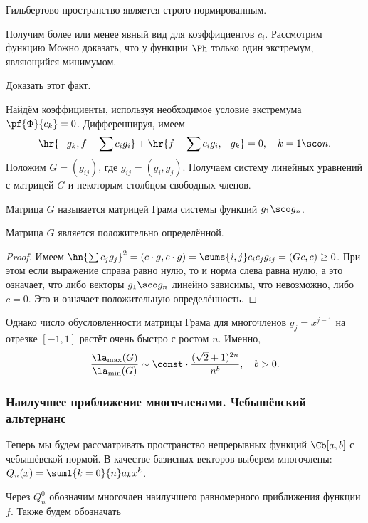 \documentclass[a4paper]{article}
\begin{document}
\begin{problem}
Гильбертово пространство является строго нормированным.
\end{problem}

Получим более или менее явный вид для коэффициентов $c_i$.  Рассмотрим
функцию   Можно доказать, что у функции $\Ph$ только один
экстремум, являющийся минимумом.
\begin{problem}
Доказать этот факт.
\end{problem}
Найдём коэффициенты, используя необходимое условие экстремума
$\pf{\Phi}{c_k} = 0$.  Дифференцируя, имеем
$$\hr{-g_k, f- \sum c_i g_i} + \hr{f - \sum c_i g_i, -g_k} = 0, \quad
k = 1\sco n.$$ Положим $G = (g_{ij})$, где $g_{ij} = (g_i, g_j)$.
Получаем систему линейных уравнений с матрицей $G$ и некоторым
столбцом свободных членов.

Матрица $G$ называется матрицей Грама системы функций $g_1\sco g_n$.
\begin{stm}
Матрица $G$ является положительно определённой.
\end{stm}
\begin{proof}
Имеем $\hn{\sum c_j g_j}^2 = (c \cdot g, c \cdot g) = \sums{i,j} c_i
c_j g_{ij} = (Gc, c) \ge 0$.  При этом если выражение справа равно
нулю, то и норма слева равна нулю, а это означает, что либо векторы
$g_1\sco g_n$ линейно зависимы, что невозможно, либо $c = 0$. Это и
означает положительную определённость.
\end{proof}

Однако число обусловленности матрицы Грама для многочленов $g_j =
x^{j-1}$ на отрезке $[-1,1]$ растёт очень быстро с ростом $n$. Именно,
$$\frac{\la_{\max}(G)}{\la_{\min}(G)} \sim \const \cdot\frac{(\sqrt2 +
  1)^{2n}}{n^b}, \quad b > 0.$$

\subsubsection{Наилучшее приближение многочленами. Чебышёвский альтернанс}

Теперь мы будем рассматривать пространство непрерывных функций
$\Cb[a,b]$ с чебышёвской нормой.  В качестве базисных векторов выберем
многочлены: $Q_n(x) = \suml{k=0}{n} a_k x^k$.

Через $Q_n^0$ обозначим многочлен наилучшего равномерного приближения
функции $f$.  Также будем обозначать 
\end{document}
